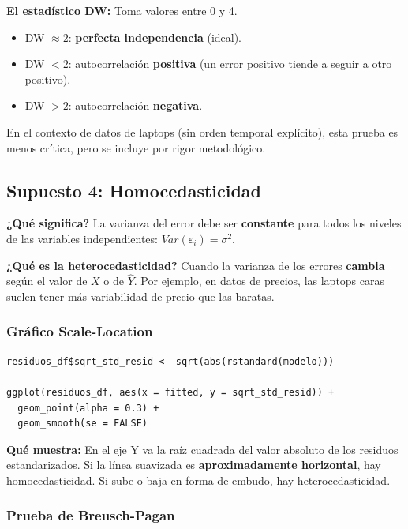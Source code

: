 \documentclass[12pt,a4paper]{article}
\begin{document}
\textbf{El estadístico DW:} Toma valores entre 0 y 4.
\begin{itemize}
    \item DW $\approx 2$: \textbf{perfecta independencia} (ideal).
    \item DW $< 2$: autocorrelación \textbf{positiva} (un error positivo tiende a seguir a otro positivo).
    \item DW $> 2$: autocorrelación \textbf{negativa}.
\end{itemize}

En el contexto de datos de laptops (sin orden temporal explícito), esta prueba es menos crítica, pero se incluye por rigor metodológico.

\subsection{Supuesto 4: Homocedasticidad}

\textbf{¿Qué significa?} La varianza del error debe ser \textbf{constante} para todos los niveles de las variables independientes: $Var(\varepsilon_i) = \sigma^2$.

\textbf{¿Qué es la heterocedasticidad?} Cuando la varianza de los errores \textbf{cambia} según el valor de $X$ o de $\hat{Y}$. Por ejemplo, en datos de precios, las laptops caras suelen tener más variabilidad de precio que las baratas.

\subsubsection{Gráfico Scale-Location}

\begin{lstlisting}[caption={Scale-Location para diagnosticar heterocedasticidad}]
residuos_df$sqrt_std_resid <- sqrt(abs(rstandard(modelo)))

ggplot(residuos_df, aes(x = fitted, y = sqrt_std_resid)) +
  geom_point(alpha = 0.3) +
  geom_smooth(se = FALSE)
\end{lstlisting}

\textbf{Qué muestra:} En el eje Y va la raíz cuadrada del valor absoluto de los residuos estandarizados. Si la línea suavizada es \textbf{aproximadamente horizontal}, hay homocedasticidad. Si sube o baja en forma de embudo, hay heterocedasticidad.

\subsubsection{Prueba de Breusch-Pagan}
\end{document}
